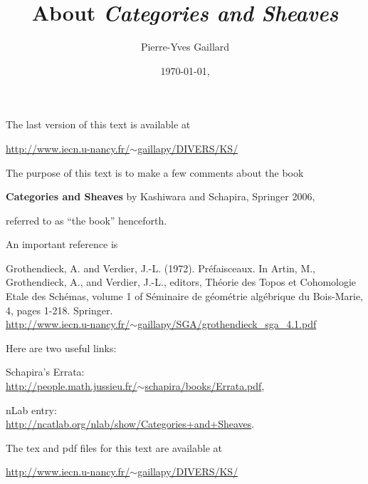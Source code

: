 \documentclass[12pt]{article}
\title{About \em{Categories and Sheaves}}
\author{Pierre-Yves Gaillard}
\date{\today, \currenttime}
\theoremstyle{remark}
\theoremstyle{definition}
\begin{document}
\fancyhf{}
\maketitle

\noindent The last version of this text is available at

\noindent\href{http://www.iecn.u-nancy.fr/~gaillapy/DIVERS/KS/}{http://www.iecn.u-nancy.fr/$\sim$gaillapy/DIVERS/KS/}

\tableofcontents\newpage%

\noindent The purpose of this text is to make a few comments about the book%

\textbf{Categories and Sheaves} by Kashiwara and Schapira, Springer 2006,%

\noindent referred to as ``the book'' henceforth.%

An important reference is

\noindent[GV] Grothendieck, A. and Verdier, J.-L. (1972). Pr\'efaisceaux. In Artin, M., Grothendieck, A., and Verdier, J.-L., editors, Th\'eorie des Topos et Cohomologie Etale des Sch\'emas, volume 1 of S\'eminaire de g\'eom\'etrie alg\'ebrique du Bois-Marie, 4, pages 1-218. Springer. \\ 
\noindent\href{http://www.iecn.u-nancy.fr/~gaillapy/SGA/grothendieck_sga_4.1.pdf}{http://www.iecn.u-nancy.fr/$\sim$gaillapy/SGA/grothendieck\_sga\_4.1.pdf} 

Here are two useful links:

\noindent Schapira's Errata:\\ \href{http://people.math.jussieu.fr/~schapira/books/Errata.pdf}{http://people.math.jussieu.fr/$\sim$schapira/books/Errata.pdf},

\noindent nLab entry:\\ \href{http://ncatlab.org/nlab/show/Categories+and+Sheaves}{http://ncatlab.org/nlab/show/Categories+and+Sheaves}. 

The tex and pdf files for this text are available at 
 
\noindent\href{http://www.iecn.u-nancy.fr/~gaillapy/DIVERS/KS/}{http://www.iecn.u-nancy.fr/$\sim$gaillapy/DIVERS/KS/} 
 
 
\end{document}
